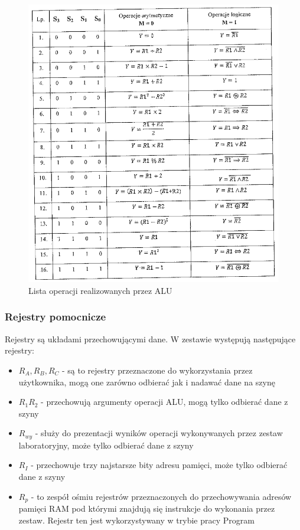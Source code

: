 \documentclass[../main.tex]{subfiles}
\begin{document}
        \begin{figure}[H]
            \centering
            \includegraphics[width=\linewidth]{operacje_alu.png}
            \caption{Lista operacji realizowanych przez ALU}
            \label{fig:operacje_alu}
        \end{figure}

        \subsubsection*{Rejestry pomocnicze}
        Rejestry są układami przechowującymi dane. W zestawie występują następujące rejestry:
        \begin{itemize}
            \item $R_A, R_B, R_C$ - są to rejestry przeznaczone do wykorzystania przez użytkownika, 
            mogą one zarówno odbierać jak i nadawać dane na szynę
            \item $R_1 R_2$ - przechowują argumenty operacji ALU, mogą tylko odbierać dane z szyny
            \item $R_{wy}$ - służy do prezentacji wyników operacji wykonywanych przez zestaw laboratoryjny, może tylko odbierać dane z szyny
            \item $R_I$ - przechowuje trzy najstarsze bity adresu pamięci, może tylko odbierać dane z szyny
            \item $R_p$ - to zespół ośmiu rejestrów przeznaczonych do przechowywania adresów pamięci RAM pod którymi znajdują
            się instrukcje do wykonania przez zestaw. Rejestr ten jest wykorzystywany w trybie pracy Program
        \end{itemize}
\end{document}
